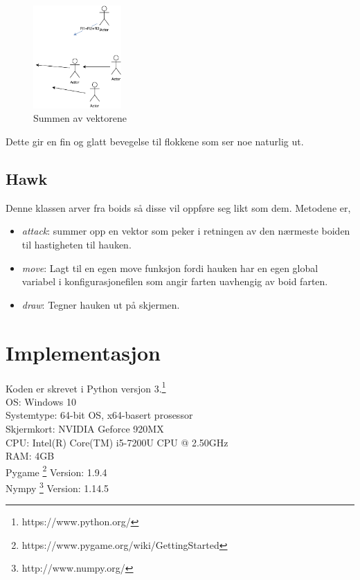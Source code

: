 \documentclass[10pt]{article}
\begin{document}
{\begin{figure}[hbt!]
{\centering
    \includegraphics[width=0.30\textwidth]{rulelast.pdf}
    \caption{Summen av vektorene}
    \label{sumvektor}
\par}
\end{figure}

Dette gir en fin og glatt bevegelse til flokkene som ser noe naturlig ut.


\subsection{Hawk}

Denne klassen arver fra boids så disse vil oppføre seg likt som dem. Metodene er,

\begin{itemize}
    \item \emph{attack}: summer opp en vektor som peker i retningen av den nærmeste boiden til hastigheten til hauken.
    \item \emph{move}: Lagt til en egen move funksjon fordi hauken har en egen global variabel i konfigurasjonefilen som angir farten uavhengig av boid farten.
    \item \emph{draw}: Tegner hauken ut på skjermen.
\end{itemize}




\section{Implementasjon}
Koden er skrevet i Python versjon 3.\footnote{https://www.python.org/}\\
OS: Windows 10\\
Systemtype: 64-bit OS, x64-basert prosessor\\
Skjermkort: NVIDIA Geforce 920MX\\
CPU: Intel(R) Core(TM) i5-7200U CPU @ 2.50GHz\\
RAM: 4GB\\
Pygame \footnote{https://www.pygame.org/wiki/GettingStarted} Version: 1.9.4\\
Nympy \footnote{http://www.numpy.org/} Version: 1.14.5\\






}
\end{document}
